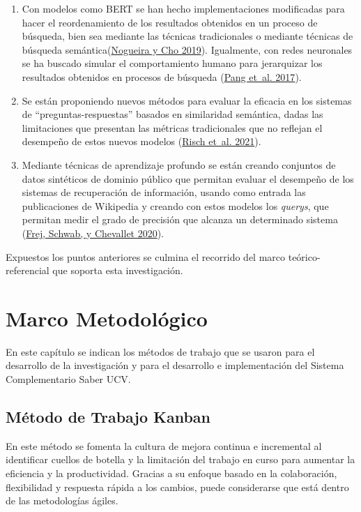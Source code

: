 \documentclass[
  12pt,
  openany]{book}
\begin{document}
\begin{enumerate}
\def\labelenumi{\arabic{enumi}.}
\item
  Con modelos como BERT se han hecho implementaciones modificadas para hacer el reordenamiento de los resultados obtenidos en un proceso de búsqueda, bien sea mediante las técnicas tradicionales o mediante técnicas de búsqueda semántica(\protect\hyperlink{ref-nogueira2019}{Nogueira y Cho 2019}). Igualmente, con redes neuronales se ha buscado simular el comportamiento humano para jerarquizar los resultados obtenidos en procesos de búsqueda (\protect\hyperlink{ref-pang2017}{Pang et~al. 2017}).
\item
  Se están proponiendo nuevos métodos para evaluar la eficacia en los sistemas de ``preguntas-respuestas'' basados en similaridad semántica, dadas las limitaciones que presentan las métricas tradicionales que no reflejan el desempeño de estos nuevos modelos (\protect\hyperlink{ref-risch2021}{Risch et~al. 2021}).
\item
  Mediante técnicas de aprendizaje profundo se están creando conjuntos de datos sintéticos de dominio público que permitan evaluar el desempeño de los sistemas de recuperación de información, usando como entrada las publicaciones de Wikipedia y creando con estos modelos los \emph{querys}, que permitan medir el grado de precisión que alcanza un determinado sistema (\protect\hyperlink{ref-frej-etal-2020-wikir}{Frej, Schwab, y Chevallet 2020}).
\end{enumerate}

Expuestos los puntos anteriores se culmina el recorrido del marco teórico-referencial que soporta esta investigación.

\hypertarget{mm}{%
\chapter{Marco Metodológico}\label{mm}}

En este capítulo se indican los métodos de trabajo que se usaron para el desarrollo de la investigación y para el desarrollo e implementación del Sistema Complementario Saber UCV.

\hypertarget{mmmetodologia}{%
\section{Método de Trabajo Kanban}\label{mmmetodologia}}

En este método se fomenta la cultura de mejora continua e incremental al identificar cuellos de botella y la limitación del trabajo en curso para aumentar la eficiencia y la productividad. Gracias a su enfoque basado en la colaboración, flexibilidad y respuesta rápida a los cambios, puede considerarse que está dentro de las metodologías ágiles.
\end{document}
